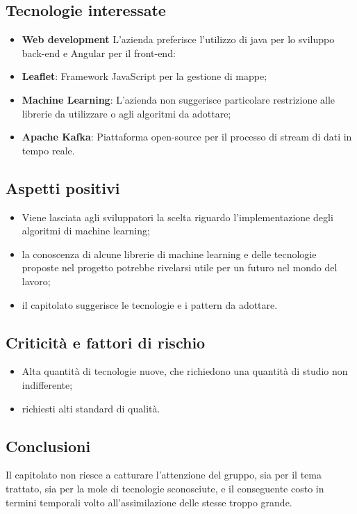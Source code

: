 \subsection{Tecnologie interessate}
\begin{itemize}
    \item \textbf{Web development} L'azienda preferisce l'utilizzo di java per lo sviluppo back-end e Angular per il front-end:
    \item \textbf{Leaflet}: Framework JavaScript per la gestione di mappe;
    \item \textbf{Machine Learning}: L'azienda non suggerisce particolare restrizione alle librerie da utilizzare o agli algoritmi da adottare;
    \item \textbf{Apache Kafka}: Piattaforma open-source per il processo di stream di dati in tempo reale.
\end{itemize}
\subsection{Aspetti positivi}
\begin{itemize}
    \item Viene lasciata agli sviluppatori la scelta riguardo l'implementazione degli algoritmi di machine learning;
    \item la conoscenza di alcune librerie di machine learning e delle tecnologie proposte nel progetto potrebbe rivelarsi utile per un futuro nel mondo del lavoro;
    \item il capitolato suggerisce le tecnologie e i pattern da adottare.
\end{itemize}
\subsection{Criticità e fattori di rischio}
\begin{itemize}
    \item Alta quantità di tecnologie nuove, che richiedono una quantità di studio non indifferente;
    \item richiesti alti standard di qualità.
\end{itemize}
\subsection{Conclusioni}
Il capitolato non riesce a catturare l'attenzione del gruppo, sia per il tema trattato, sia per la mole di tecnologie sconosciute, e il conseguente costo in termini temporali volto all'assimilazione delle stesse troppo grande.
